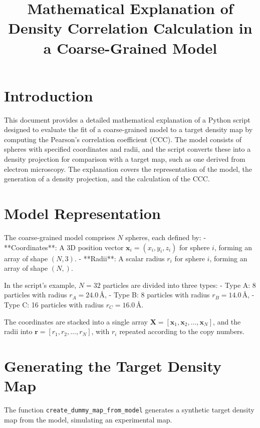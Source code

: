 \documentclass{article}
\begin{document}
\title{Mathematical Explanation of Density Correlation Calculation in a Coarse-Grained Model}
\author{}
\date{}
\maketitle

\section{Introduction}

This document provides a detailed mathematical explanation of a Python script designed to evaluate the fit of a coarse-grained model to a target density map by computing the Pearson's correlation coefficient (CCC). The model consists of spheres with specified coordinates and radii, and the script converts these into a density projection for comparison with a target map, such as one derived from electron microscopy. The explanation covers the representation of the model, the generation of a density projection, and the calculation of the CCC.

\section{Model Representation}

The coarse-grained model comprises \( N \) spheres, each defined by:
- **Coordinates**: A 3D position vector \( \mathbf{x}_i = (x_i, y_i, z_i) \) for sphere \( i \), forming an array of shape \( (N, 3) \).
- **Radii**: A scalar radius \( r_i \) for sphere \( i \), forming an array of shape \( (N,) \).

In the script's example, \( N = 32 \) particles are divided into three types:
- Type A: 8 particles with radius \( r_A = 24.0 \, \text{\AA} \),
- Type B: 8 particles with radius \( r_B = 14.0 \, \text{\AA} \),
- Type C: 16 particles with radius \( r_C = 16.0 \, \text{\AA} \).

The coordinates are stacked into a single array \( \mathbf{X} = [\mathbf{x}_1, \mathbf{x}_2, \ldots, \mathbf{x}_N] \), and the radii into \( \mathbf{r} = [r_1, r_2, \ldots, r_N] \), with \( r_i \) repeated according to the copy numbers.

\section{Generating the Target Density Map}

The function \texttt{create\_dummy\_map\_from\_model} generates a synthetic target density map from the model, simulating an experimental map.
\end{document}

